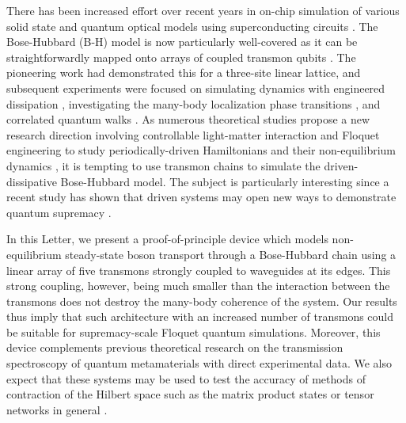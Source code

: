 \documentclass[%
 aps, prl,
 amsmath,amssymb,
 reprint,%
superscriptaddress
]{revtex4-2}
\begin{document}
\maketitle



There has been increased effort over recent years in on-chip simulation of various solid state and quantum optical models using superconducting circuits \cite{kjaergaard2019superconducting}. The Bose-Hubbard (B-H) model is now particularly well-covered as it can be straightforwardly mapped onto arrays of coupled transmon qubits \cite{orell2019probing,yanay2020two}. The pioneering work \cite{hacohen2015cooling} had demonstrated this for a three-site linear lattice, and subsequent experiments were focused on simulating dynamics with engineered dissipation \cite{ma2019dissipatively}, investigating the many-body localization phase transitions \cite{roushan2017spectroscopic,chiaro2019growth}, and correlated quantum walks \cite{Yan2019, Ye2019}. As numerous theoretical studies propose a new research direction involving controllable light-matter interaction and Floquet engineering to study periodically-driven Hamiltonians and their non-equilibrium dynamics \cite{Goldman2014, eisert2015quantum, Zippilli2015, kyriienko2018floquet, franca2020simulating}, it is tempting to use transmon chains  to simulate the driven-dissipative Bose-Hubbard model. The subject is particularly interesting since a recent study has shown that driven systems may open new ways to demonstrate quantum supremacy \cite{tangpanitanon2019quantum}.

In this Letter, we present a proof-of-principle device which models non-equilibrium steady-state boson transport through a Bose-Hubbard chain using a linear array of five transmons strongly coupled to waveguides at its edges. This strong coupling, however, being much smaller than the interaction between the transmons does not destroy the many-body coherence of the system. Our results thus imply that such architecture with an increased number of transmons could be suitable for supremacy-scale Floquet quantum simulations. Moreover, this device complements previous theoretical research on the transmission spectroscopy of quantum metamaterials \cite{Zagoskin2016, viehmann2013observing, Greenberg2015, Fistul2019, Biella2015,roberts2020driven, collodo2019observation,tiwari2020interplay} with direct experimental data. We also expect that these systems may be used to test the accuracy of methods of contraction of the Hilbert space such as the matrix product states or tensor networks in general \cite{Biella2015, orell2019probing, di2019efficient}.
\end{document}
